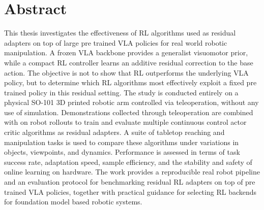 \cleardoublepage
{}

\chapter*{Abstract}

This thesis investigates the effectiveness of \ac{RL} algorithms used as residual adapters on top of large pre trained \ac{VLA} policies for real world robotic manipulation. A frozen \ac{VLA} backbone provides a generalist visuomotor prior, while a compact \ac{RL} controller learns an additive residual correction to the base action. The objective is not to show that \ac{RL} outperforms the underlying \ac{VLA} policy, but to determine which \ac{RL} algorithms most effectively exploit a fixed pre trained policy in this residual setting. The study is conducted entirely on a physical SO-101 3D printed robotic arm controlled via teleoperation, without any use of simulation. Demonstrations collected through teleoperation are combined with on robot rollouts to train and evaluate multiple continuous control actor critic algorithms as residual adapters. A suite of tabletop reaching and manipulation tasks is used to compare these algorithms under variations in objects, viewpoints, and dynamics. Performance is assessed in terms of task success rate, adaptation speed, sample efficiency, and the stability and safety of online learning on hardware. The work provides a reproducible real robot pipeline and an evaluation protocol for benchmarking residual \ac{RL} adapters on top of pre trained \ac{VLA} policies, together with practical guidance for selecting \ac{RL} backends for foundation model based robotic systems.

